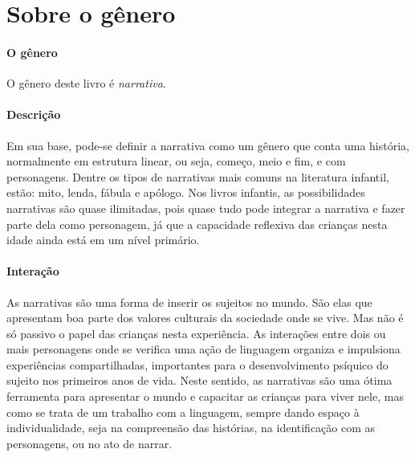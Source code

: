 \documentclass[11pt]{extarticle}
\begin{document}
\section{Sobre o gênero}

\paragraph{O gênero} O gênero deste livro é \textit{narrativa}. 


\paragraph{Descrição} Em sua base, pode-se definir a narrativa como um gênero que conta uma história, normalmente em estrutura linear, ou seja, começo, meio e fim, e com personagens. 
Dentre os tipos de narrativas mais comuns na literatura infantil, estão: mito, lenda, 
fábula e apólogo. Nos livros infantis, as possibilidades narrativas são quase ilimitadas, pois quase tudo pode integrar a narrativa e fazer parte dela como personagem, já que a capacidade reflexiva das crianças nesta idade ainda está em um nível primário. 



\paragraph{Interação} As narrativas são uma forma de inserir os sujeitos no mundo. 
São elas que apresentam boa parte dos valores culturais da sociedade 
onde se vive. Mas não é só passivo o papel das crianças nesta experiência. 
As interações entre dois ou mais personagens onde se verifica
uma ação de linguagem organiza e impulsiona experiências compartilhadas,
importantes para o desenvolvimento psíquico do sujeito nos primeiros anos de vida.
Neste sentido, as narrativas são uma ótima ferramenta para
apresentar o mundo e capacitar as crianças para viver nele, mas como se
trata de um trabalho com a linguagem, sempre dando espaço à individualidade, 
seja na compreensão das histórias, na identificação com as personagens, ou 
no ato de narrar.

\end{document}
